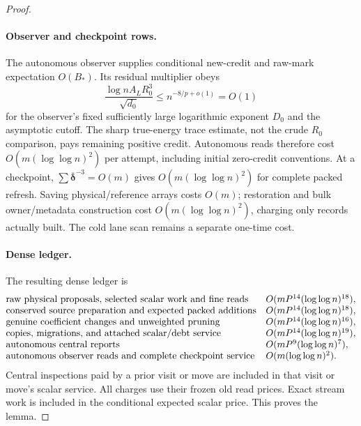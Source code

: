 \documentclass[11pt]{article}
\theoremstyle{remark}
\newcommand{\ddeltabar}{\overline{\boldsymbol{\delta}}}
\begin{document}
\begin{proof}
\paragraph{Observer and checkpoint rows.}
The autonomous observer supplies conditional new-credit and raw-mark expectation
$O(B_*)$.
Its residual multiplier obeys
\[
 \frac{\log nA_LR_0^3}{\sqrt{d_0}}
       \le n^{-8/p+o(1)}=O(1)
\]
for the observer's fixed sufficiently large logarithmic exponent $D_0$ and the
asymptotic cutoff.
The sharp true-energy trace estimate, not the crude $R_0$ comparison, pays
remaining positive credit.
Autonomous reads therefore cost $O(m(\log\log n)^2)$ per attempt, including initial
zero-credit conventions.
At a checkpoint, $\sum\ddeltabar^{-3}=O(m)$ gives $O(m(\log\log n)^2)$ for complete
packed refresh.
Saving physical/reference arrays costs $O(m)$; restoration and bulk
owner/metadata construction cost $O(m(\log\log n)^2)$, charging only records actually
built.
The cold lane scan remains a separate one-time cost.

\paragraph{Dense ledger.}
The resulting dense ledger is
\[
\begin{array}{@{}ll@{}}
\text{raw physical proposals, selected scalar work and fine reads}
   &O(mP^{14}(\log\log n)^{18}),\\
\text{conserved source preparation and expected packed additions}
   &O(mP^{14}(\log\log n)^{18}),\\
\text{genuine coefficient changes and unweighted pruning}
   &O(mP^{14}(\log\log n)^{16}),\\
\text{copies, migrations, and attached scalar/debt service}
   &O(mP^{14}(\log\log n)^{19}),\\
\text{autonomous central reports}
   &O(mP^9(\log\log n)^7),\\
\text{autonomous observer reads and complete checkpoint service}
   &O(m(\log\log n)^2).
\end{array}
\]
Central inspections paid by a prior visit or move are included in that visit or
move's scalar service.
All charges use their frozen old read prices.
Exact stream work is included in the conditional expected scalar price.
This proves the lemma.
\end{proof}
\end{document}

